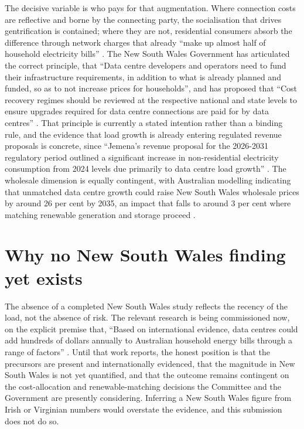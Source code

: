 The decisive variable is who pays for that augmentation. Where connection costs are reflective and borne by the connecting party, the socialisation that drives gentrification is contained; where they are not, residential consumers absorb the difference through network charges that already \enquote{make up almost half of household electricity bills} \autocite{ecaDataCentresEnergyLandscape2025}. The New South Wales Government has articulated the correct principle, that \enquote{Data centre developers and operators need to fund their infrastructure requirements, in addition to what is already planned and funded, so as to not increase prices for households}, and has proposed that \enquote{Cost recovery regimes should be reviewed at the respective national and state levels to ensure upgrades required for data centre connections are paid for by data centres} \autocite{inswDataCentreConsultation2026}. That principle is currently a stated intention rather than a binding rule, and the evidence that load growth is already entering regulated revenue proposals is concrete, since \enquote{Jemena's revenue proposal for the 2026-2031 regulatory period outlined a significant increase in non-residential electricity consumption from 2024 levels due primarily to data centre load growth} \autocite{ecaConsumerImpactsDataCentres2025}. The wholesale dimension is equally contingent, with Australian modelling indicating that unmatched data centre growth could raise New South Wales wholesale prices by around 26 per cent by 2035, an impact that falls to around 3 per cent where matching renewable generation and storage proceed \autocite{cefcBaringaDataCentres2025}.

\section{Why no New South Wales finding yet exists}
\label{sec:supp:gen:gap}

The absence of a completed New South Wales study reflects the recency of the load, not the absence of risk. The relevant research is being commissioned now, on the explicit premise that, \enquote{Based on international evidence, data centres could add hundreds of dollars annually to Australian household energy bills through a range of factors} \autocite{ecaConsumerImpactsDataCentres2025}. Until that work reports, the honest position is that the precursors are present and internationally evidenced, that the magnitude in New South Wales is not yet quantified, and that the outcome remains contingent on the cost-allocation and renewable-matching decisions the Committee and the Government are presently considering. Inferring a New South Wales figure from Irish or Virginian numbers would overstate the evidence, and this submission does not do so.

